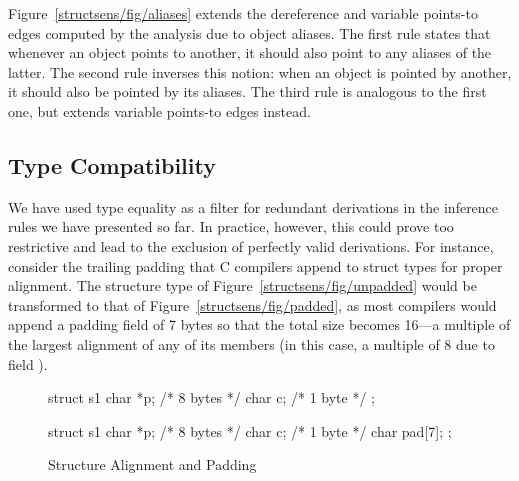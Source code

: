 Figure~\ref{structsens/fig/aliases} extends the dereference and
variable points-to edges computed by the analysis due to object
aliases. The first rule states that whenever an object points to
another, it should also point to any aliases of the latter. The second
rule inverses this notion: when an object is pointed by another, it
should also be pointed by its aliases. The third rule is analogous to
the first one, but extends variable points-to edges instead.


\subsection{Type Compatibility}

We have used type equality as a filter for redundant derivations in
the inference rules we have presented so far. In practice, however,
this could prove too restrictive and lead to the exclusion of
perfectly valid derivations. For instance, consider the trailing
padding that C compilers append to struct types for proper
alignment. The structure type of Figure~\ref{structsens/fig/unpadded}
would be transformed to that of Figure~\ref{structsens/fig/padded}, as
most compilers would append a padding field of 7 bytes so that the
total size becomes 16---a multiple of the largest alignment of any of
its members (in this case, a multiple of 8 due to field ).

\begin{figure}[h!t]
  \centering
  \begin{minipage}[b]{.4\linewidth}
    \centering\large
    \begin{cppcode}
      struct s1 {
        char *p;     /* 8 bytes */
        char c;      /* 1 byte */
      };
    \end{cppcode}
    \label{structsens/fig/unpadded}
  \end{minipage}%
  \qquad
  \begin{minipage}[b]{.4\linewidth}
    \centering\large
    \begin{cppcode}
      struct s1 {
        char *p;     /* 8 bytes */
        char c;      /* 1 byte */
        char pad[7];
      };
    \end{cppcode}
    \label{structsens/fig/padded}
  \end{minipage}
  \caption{Structure Alignment and Padding}
  \label{structsens/fig/padding}
\end{figure}

